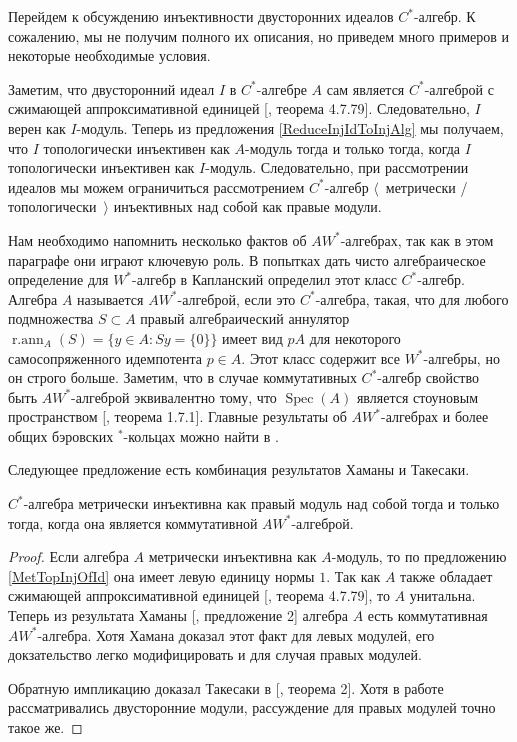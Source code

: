 Перейдем к обсуждению инъективности двусторонних идеалов $C^*$-алгебр. К сожалению, мы не получим полного их описания, но приведем много примеров и некоторые необходимые условия. 

Заметим, что двусторонний идеал $I$ в $C^*$-алгебре $A$ сам является $C^*$-алгеброй с сжимающей аппроксимативной единицей [\cite{HelBanLocConvAlg}, теорема 4.7.79]. Следовательно, $I$ верен как $I$-модуль. Теперь из предложения \ref{ReduceInjIdToInjAlg} мы получаем, что $I$ топологически инъективен как $A$-модуль тогда и только тогда, когда $I$ топологически инъективен как $I$-модуль. Следовательно, при рассмотрении идеалов мы можем ограничиться рассмотрением $C^*$-алгебр $\langle$~метрически / топологически~$\rangle$ инъективных над собой как правые модули.

Нам необходимо напомнить несколько фактов об $AW^*$-алгебрах, так как в этом параграфе они играют ключевую роль. В попытках дать чисто алгебраическое определение для $W^*$-алгебр в \cite{KaplProjInBanAlg} Капланский определил этот класс $C^*$-алгебр. Алгебра $A$ называется $AW^*$-алгеброй, если это $C^*$-алгебра, такая, что для любого подмножества $S\subset A$ правый алгебраический аннулятор $\operatorname{r.ann}_A(S)=\{y\in A: Sy=\{0\}\}$ имеет вид $pA$ для некоторого самосопряженного идемпотента $p\in A$. Этот класс содержит все $W^*$-алгебры, но он строго больше. Заметим, что в случае коммутативных $C^*$-алгебр свойство быть $AW^*$-алгеброй эквивалентно тому, что $\operatorname{Spec}(A)$ является стоуновым пространством [\cite{BerbBaerStarRings}, теорема 1.7.1]. Главные результаты об $AW^*$-алгебрах и более общих бэровских ${}^*$-кольцах можно найти в \cite{BerbBaerStarRings}. 

Следующее предложение есть комбинация результатов Хаманы и Такесаки.

\begin{proposition}\label{MetInjCStarAlgCharac} $C^*$-алгебра метрически инъективна как правый модуль над собой тогда и только тогда, когда она является коммутативной $AW^*$-алгеброй.
\end{proposition}
\begin{proof} Если алгебра $A$ метрически инъективна как $A$-модуль, то по предложению \ref{MetTopInjOfId} она имеет левую единицу нормы $1$. Так как $A$ также обладает сжимающей аппроксимативной единицей  [\cite{HelBanLocConvAlg}, теорема 4.7.79], то $A$ унитальна. Теперь из результата Хаманы  [\cite{HamInjEnvBanMod}, предложение 2] алгебра $A$ есть коммутативная $AW^*$-алгебра. Хотя Хамана доказал этот факт для левых модулей, его докзательство легко модифицировать и для случая правых модулей.

Обратную импликацию доказал Такесаки в [\cite{TakHanBanThAndJordDecomOfModMap}, теорема 2]. Хотя в работе рассматривались двусторонние модули, рассуждение для правых модулей точно такое же.
\end{proof}

